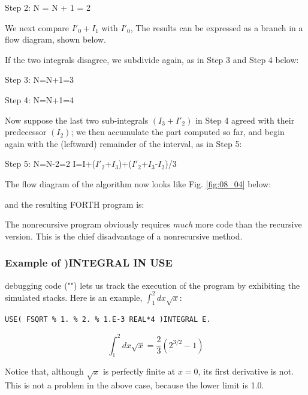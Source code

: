 Step 2: N = N + 1 = 2


We next compare $I'_0 + I_1$ with $I'_0$, The results can be expressed as a branch in a flow diagram, shown below.



If the two integrals disagree, we subdivide again, as in Step 3 and
Step 4 below:

Step 3: N=N+1=3


Step 4: N=N+1=4


Now suppose the last two sub-integrals $(I_3 + I'_2)$ in Step 4 agreed with their predecessor $(I_2)$; we then accumulate the part computed so far, and begin again with the (leftward) remainder of the interval, as in Step 5:

Step 5: N=N-2=2 \quad I=I+($I'_2$+$I_3$)+($I'_2$+$I_3$-$I_2$)/3


The flow diagram of the algorithm now looks like Fig. \ref{fig:08_04} below:



and the resulting FORTH program is:



The nonrecursive program obviously requires \textit{much} more code than the recursive version. This is the chief disadvantage of a nonrecursive method.

\subsubsection{Example of )INTEGRAL IN USE}
 debugging code ("") lets us track the execution of the program by exhibiting the simulated stacks. Here is an example, $\int_{1}^{2} dx \sqrt{x}$:
\begin{lstlisting}
USE( FSQRT % 1. % 2. % 1.E-3 REAL*4 )INTEGRAL E.
\end{lstlisting}



\begin{equation*}
\int_{1}^{2}dx\sqrt{x} = \frac{2}{3} \left( 2^{3/2} - 1 \right)
\end{equation*}

Notice that, although $\sqrt{x}$ is perfectly finite at $x = 0$, its first derivative is not. This is not a problem in the above case, because the lower limit is 1.0.

